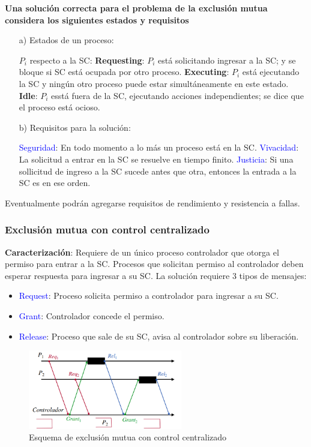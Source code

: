 \textbf{Una solución correcta para el problema de la exclusión mutua considera los siguientes estados y requisitos}

\begin{itemize}
    \item[a)] Estados de un proceso:
    
    $P_i$ respecto a la SC: \textbf{Requesting}: $P_i$ está solicitando ingresar a la SC; y se bloque si SC está ocupada por otro proceso. \textbf{Executing}: $P_i$ está ejecutando la SC y ningún otro proceso puede estar simultáneamente en este estado. \textbf{Idle}: $P_i$ esstá fuera de la SC, ejecutando acciones independientes; se dice que el proceso está ocioso.

    \item[b)] Requisitos para la solución:
    
    \textcolor{blue}{Seguridad}: En todo momento a lo más un proceso está en la SC. \textcolor{blue}{Vivacidad}: La solicitud a entrar en la SC se resuelve en tiempo finito. \textcolor{blue}{Justicia}: Si una sollicitud de ingreso a la SC sucede antes que otra, entonces la entrada a la SC es en ese orden.
\end{itemize}

Eventualmente podrán agregarse requisitos de rendimiento y resistencia a fallas.

\subsubsection{Exclusión mutua con control centralizado}

\textbf{Caracterización}: Requiere de un único proceso controlador que otorga el permiso para entrar a la SC. Procesos que solicitan permiso al controlador deben esperar respuesta para ingresar a su SC. La solución requiere 3 tipos de mensajes: 

\begin{itemize}
    \item \textcolor{blue}{Request}: Proceso solicita permiso a controlador para ingresar a su SC.
    \item \textcolor{blue}{Grant}: Controlador concede el permiso.
    \item \textcolor{blue}{Release}: Proceso que sale de su SC, avisa al controlador sobre su liberación.
\end{itemize}

\begin{figure}[H]
    \centering
    \includegraphics[width=0.6\textwidth]{img/E_M_Control_Centralizado.png}
    \caption{Esquema de exclusión mutua con control centralizado}
\end{figure}

